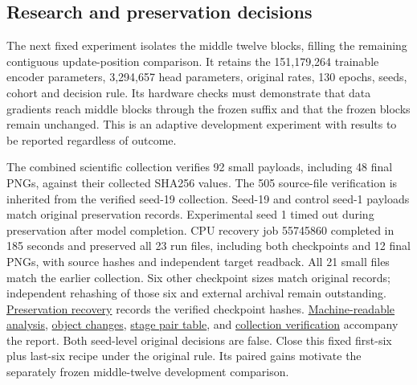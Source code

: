 \documentclass[
  11pt,
]{article}
\begin{document}
\subsection{Research and preservation
decisions}\label{research-and-preservation-decisions}

The next fixed experiment isolates the middle twelve blocks, filling the
remaining contiguous update-position comparison. It retains the
151,179,264 trainable encoder parameters, 3,294,657 head parameters,
original rates, 130 epochs, seeds, cohort and decision rule. Its
hardware checks must demonstrate that data gradients reach middle blocks
through the frozen suffix and that the frozen blocks remain unchanged.
This is an adaptive development experiment with results to be reported
regardless of outcome.

The combined scientific collection verifies 92 small payloads, including
48 final PNGs, against their collected SHA256 values. The 505
source-file verification is inherited from the verified seed-19
collection. Seed-19 and control seed-1 payloads match original
preservation records. Experimental seed 1 timed out during preservation
after model completion. CPU recovery job 55745860 completed in 185
seconds and preserved all 23 run files, including both checkpoints and
12 final PNGs, with source hashes and independent target readback. All
21 small files match the earlier collection. Six other checkpoint sizes
match original records; independent rehashing of those six and external
archival remain outstanding.
\href{../P29_PRESERVATION_RECOVERY.json}{Preservation recovery} records
the verified checkpoint hashes.
\href{../p29_verified_analysis.json}{Machine-readable analysis},
\href{../object_summary.json}{object changes},
\href{../stage_pairs.csv}{stage pair table}, and
\href{../collection_result.json}{collection verification} accompany the
report. Both seed-level original decisions are false. Close this fixed
first-six plus last-six recipe under the original rule. Its paired gains
motivate the separately frozen middle-twelve development comparison.
\end{document}
